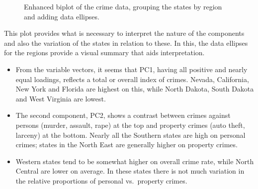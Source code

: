 \documentclass[
  letterpaper,
  10pt,
  krantz2]{krantz}
\begin{document}
\begin{figure}[H]


\caption{\label{fig-crime-biplot2}Enhanced biplot of the crime data,
grouping the states by region and adding data ellipses.}

\end{figure}%

This plot provides what is necessary to interpret the nature of the
components and also the variation of the states in relation to these. In
this, the data ellipses for the regions provide a visual summary that
aids interpretation.

\begin{itemize}
\item
  From the variable vectors, it seems that PC1, having all positive and
  nearly equal loadings, reflects a total or overall index of crimes.
  Nevada, California, New York and Florida are highest on this, while
  North Dakota, South Dakota and West Virginia are lowest.
\item
  The second component, PC2, shows a contrast between crimes against
  persons (murder, assault, rape) at the top and property crimes (auto
  theft, larceny) at the bottom. Nearly all the Southern states are high
  on personal crimes; states in the North East are generally higher on
  property crimes.
\item
  Western states tend to be somewhat higher on overall crime rate, while
  North Central are lower on average. In these states there is not much
  variation in the relative proportions of personal vs.~property crimes.
\end{itemize}
\end{document}
